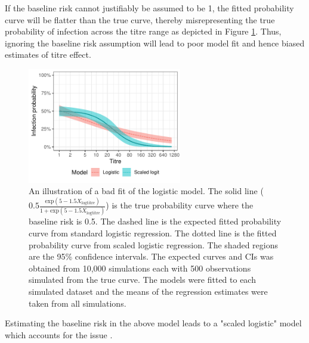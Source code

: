If the baseline risk cannot justifiably be assumed to be 1, the fitted probability curve will be flatter than the true curve, thereby misrepresenting the true probability of infection across the titre range as depicted in Figure \ref{LogisticFit}. Thus, ignoring the baseline risk assumption will lead to poor model fit and hence biased estimates of titre effect.


\begin{figure}[htp]
	\centering
	\includegraphics[width=0.6\textwidth]{../logistic-plot/predsplot.pdf}
	\caption{
	An illustration of a bad fit of the logistic model. The solid line ($0.5\frac{\text{exp}(5 - 1.5 X_{\text{logtitre}})}{1 + \text{exp}(5 - 1.5 X_{\text{logtitre}})}$) is the true probability curve where the baseline risk is 0.5. The dashed line is the expected fitted probability curve from standard logistic regression. The dotted line is the fitted probability curve from scaled logistic regression. The shaded regions are the 95\% confidence intervals. The expected curves and CIs was obtained from 10,000 simulations each with 500 observations simulated from the true curve. The models were fitted to each simulated dataset and the means of the regression estimates were taken from all simulations.
}
	\label{LogisticFit}
\end{figure}

Estimating the baseline risk in the above model leads to a "scaled logistic" model which accounts for the issue \cite{Dunning;2006}.
